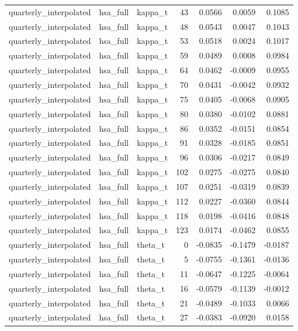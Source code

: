 \begin{tabular}{lllrrrr}
quarterly\_interpolated & hsa\_full & kappa\_t & 43 & 0.0566 & 0.0059 & 0.1085 \\
quarterly\_interpolated & hsa\_full & kappa\_t & 48 & 0.0543 & 0.0047 & 0.1043 \\
quarterly\_interpolated & hsa\_full & kappa\_t & 53 & 0.0518 & 0.0024 & 0.1017 \\
quarterly\_interpolated & hsa\_full & kappa\_t & 59 & 0.0489 & 0.0008 & 0.0984 \\
quarterly\_interpolated & hsa\_full & kappa\_t & 64 & 0.0462 & -0.0009 & 0.0955 \\
quarterly\_interpolated & hsa\_full & kappa\_t & 70 & 0.0431 & -0.0042 & 0.0932 \\
quarterly\_interpolated & hsa\_full & kappa\_t & 75 & 0.0405 & -0.0068 & 0.0905 \\
quarterly\_interpolated & hsa\_full & kappa\_t & 80 & 0.0380 & -0.0102 & 0.0881 \\
quarterly\_interpolated & hsa\_full & kappa\_t & 86 & 0.0352 & -0.0151 & 0.0854 \\
quarterly\_interpolated & hsa\_full & kappa\_t & 91 & 0.0328 & -0.0185 & 0.0851 \\
quarterly\_interpolated & hsa\_full & kappa\_t & 96 & 0.0306 & -0.0217 & 0.0849 \\
quarterly\_interpolated & hsa\_full & kappa\_t & 102 & 0.0275 & -0.0275 & 0.0840 \\
quarterly\_interpolated & hsa\_full & kappa\_t & 107 & 0.0251 & -0.0319 & 0.0839 \\
quarterly\_interpolated & hsa\_full & kappa\_t & 112 & 0.0227 & -0.0360 & 0.0844 \\
quarterly\_interpolated & hsa\_full & kappa\_t & 118 & 0.0198 & -0.0416 & 0.0848 \\
quarterly\_interpolated & hsa\_full & kappa\_t & 123 & 0.0174 & -0.0462 & 0.0855 \\
quarterly\_interpolated & hsa\_full & theta\_t & 0 & -0.0835 & -0.1479 & -0.0187 \\
quarterly\_interpolated & hsa\_full & theta\_t & 5 & -0.0755 & -0.1361 & -0.0136 \\
quarterly\_interpolated & hsa\_full & theta\_t & 11 & -0.0647 & -0.1225 & -0.0064 \\
quarterly\_interpolated & hsa\_full & theta\_t & 16 & -0.0579 & -0.1139 & -0.0012 \\
quarterly\_interpolated & hsa\_full & theta\_t & 21 & -0.0489 & -0.1033 & 0.0066 \\
quarterly\_interpolated & hsa\_full & theta\_t & 27 & -0.0383 & -0.0920 & 0.0158 \\

\end{tabular}
